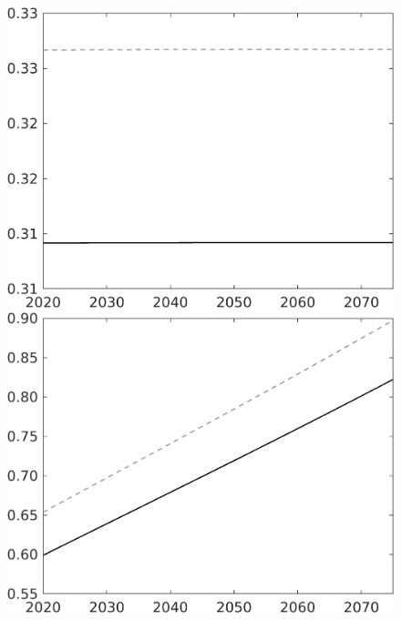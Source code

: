 \documentclass[12pt]{article}
\begin{document}
\begin{figure}[h!!]
\begin{minipage}[]{0.32\textwidth}
	\end{minipage}	
\begin{minipage}[]{0.32\textwidth}
\includegraphics[width=1\textwidth]{../../codding_model/own_basedOnFried/optimalPol_010922_revision/figures/all_13Sept22/CompTaul_LFBAU_Reg0_hl_spillover0_nsk0_xgr1_knspil1_sep1_countec0_GovRev0_etaa0.79_lgd0.png}
\end{minipage}	
	\begin{minipage}[]{0.32\textwidth}
		\includegraphics[width=1\textwidth]{../../codding_model/own_basedOnFried/optimalPol_010922_revision/figures/all_13Sept22/CompTaul_LFBAU_Reg0_C_spillover0_nsk0_xgr1_knspil1_sep1_countec0_GovRev0_etaa0.79_lgd0.png}

\end{minipage}
\end{figure}
\end{document}
